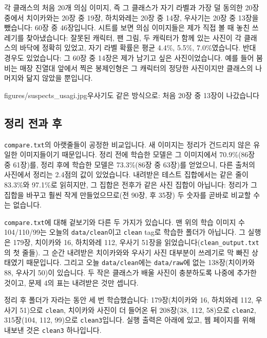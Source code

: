 \documentclass[11pt]{article}
\begin{document}
각 클래스의 처음 20개 의심 이미지, 즉 그 클래스가 자기 라벨과 가장 덜 동의한
20장 중에서 치이카와는 20장 중 19장, 하치와레는 20장 중 14장, 우사기는 20장 중
13장을 뺐습니다: 60장 중 46장입니다. 시트를 보면 의심 이미지들은 제가 직접 볼
때 놓친 쓰레기를 찾아냈습니다: 잘못된 캐릭터, 팬 그림, 두 캐릭터가 함께 있는
사진이 각 클래스의 바닥에 정확히 있었고, 자기 라벨 확률은 평균 4.4\%, 5.5\%,
7.0\%였습니다. 반대 경우도 있었습니다: 그 60장 중 14장은 제가 남기고 싶은
사진이었습니다. 예를 들어 붐비는 매장 진열대 앞에서 찍은 봉제인형은 그
캐릭터의 정당한 사진이지만 클래스의 나머지와 닮지 않았을 뿐입니다.

           {figures/suspects_usagi.jpg}{우사기도 같은 방식으로: 처음 20장 중
13장이 나갔습니다}

\subsection*{정리 전과 후}

\texttt{compare.txt}의 아랫줄들이 공정한 비교입니다. 새 이미지는 정리가 건드리지
않은 유일한 이미지들이기 때문입니다. 정리 전에 학습한 모델은 그 이미지에서
70.9\%(86장 중 61장)를, 정리 후에 학습한 모델은 73.3\%(86장 중 63장)를
얻었으니, 다른 출처의 사진에서 정리는 2.4점의 값이 있었습니다. 내려받은 테스트
집합에서는 같은 줄이 83.3\%와 97.1\%로 읽히지만, 그 집합은 전후가 같은 사진
집합이 아닙니다: 정리가 그 집합을 바꾸고 훨씬 작게 만들었으므로(전 90장,
후 35장) 두 숫자를 곧바로 비교할 수는 없습니다.

\texttt{compare.txt}에 대해 겉보기와 다른 두 가지가 있습니다. 맨 위의 학습
이미지 수 104/110/99는 오늘의 \texttt{data/clean}이고 \texttt{clean} tag로
학습한 폴더가 아닙니다. 그 실행은 179장, 치이카와 16, 하치와레 112, 우사기
51장을 읽었습니다(\texttt{clean\_output.txt}의 첫 줄들). 그 순간 내려받은
치이카와와 우사기 사진 대부분이 쓰레기로 막 빠진 상태였기 때문입니다. 그리고
오늘 \texttt{data/clean}에는 \texttt{data/raw}에 없는 138장(치이카와 88,
우사기 50)이 있습니다. 두 작은 클래스가 배울 사진이 충분하도록 나중에 추가한
것이고, 문제 4의 표는 내려받은 것만 셉니다.

정리 후 폴더가 자라는 동안 세 번 학습했습니다: 179장(치이카와 16, 하치와레
112, 우사기 51)으로 \texttt{clean}, 치이카와 사진이 더 들어온 뒤 208장(38, 112,
58)으로 \texttt{clean2}, 315장(104, 112, 99)으로 \texttt{clean3}입니다. 실행
출력은 아래에 있고, 웹 페이지를 위해 내보낸 것은 \texttt{clean3} 하나입니다.
\end{document}
